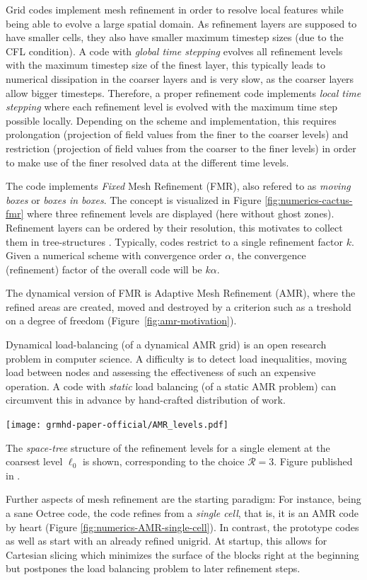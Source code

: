 %
Grid codes implement mesh refinement in order to resolve local features while being able to
evolve a large spatial domain. As refinement layers are supposed to have smaller cells, they also
have smaller maximum timestep sizes (due to the CFL condition). A code with \emph{global time
stepping} evolves all refinement levels with the maximum timestep size of the finest layer,
this typically leads to numerical dissipation in the coarser layers and is very slow, as
the coarser layers allow bigger timesteps. Therefore, a proper refinement code implements
\emph{local time stepping} where each refinement level is evolved with the maximum time step
possible locally. Depending on the scheme and implementation, this requires prolongation 
(projection of field values from the finer to the coarser levels) and restriction
(projection of field values from the coarser to the finer levels)
in order to make use of the finer resolved data at the different time levels.

The  code implements \emph{Fixed} Mesh Refinement (FMR),
also refered to as \emph{moving boxes} or \emph{boxes in boxes}. The concept is visualized
in Figure \ref{fig:numerics-cactus-fmr} where three refinement levels are displayed (here
without ghost zones). Refinement layers can be ordered by their resolution, this motivates
to collect them in tree-structures \cite{Khokhlov98}.
Typically, codes restrict to a single refinement factor $k$.
Given a numerical scheme with convergence order $\alpha$, the convergence (refinement)
factor of the overall code will be $k\alpha$.

The dynamical version of FMR is Adaptive Mesh Refinement (AMR), where the refined areas are
created, moved and destroyed by a criterion such as a treshold on a degree of freedom
(Figure~\ref{fig:amr-motivation}).

Dynamical load-balancing (of a dynamical AMR grid) is an open research problem in
computer science. A difficulty is to detect load inequalities, moving load between nodes
and assessing the effectiveness of such an expensive operation. A code with \emph{static}
load balancing (of a static AMR problem) can circumvent this in advance by hand-crafted
distribution of work.

\begin{marginfigure}
	\texttt{[image: grmhd-paper-official/AMR\_levels.pdf]}
	\caption[Space-Tree illustration, TikZ figure ,
	  ]{The
		\emph{space-tree} structure of the refinement levels for a single
		element at the coarsest level $\ell_0$ is shown, corresponding to the
		choice $\mathcal{R}=3$. Figure published in \cite{Fambri2017}. }
	\label{fig:numerics-AMR-single-cell}
\end{marginfigure}
%
Further aspects of mesh refinement are the starting paradigm: For instance,
being a sane Octree code, the  code refines from a \emph{single cell},
that is, it is an AMR code by heart (Figure \ref{fig:numerics-AMR-single-cell}).
In contrast, the  prototype codes as well as  start with 
an already refined unigrid. At startup,
this allows for Cartesian slicing which minimizes the surface of the
blocks right at the beginning but postpones the load balancing problem to later
refinement steps.

